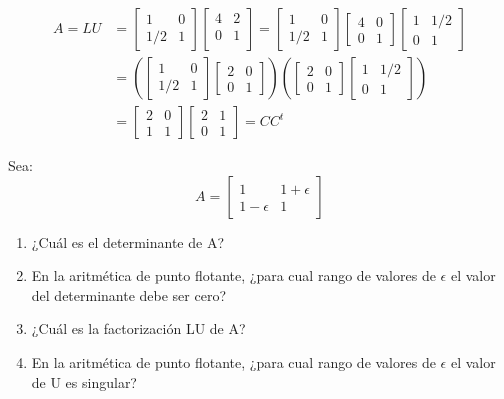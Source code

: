 \documentclass[paper=letter, fontsize=11pt]{scrartcl}
\numberwithin{equation}{section} %
\numberwithin{figure}{section} %
\numberwithin{table}{section} %
\newenvironment{cframed}[1][blue]
  {\begin{tcolorbox}[colframe=#1,colback=white]}
  {\end{tcolorbox}}
\begin{document}
\begin{enumerate}
\[
\begin{split}
A = LU& = \begin{bmatrix}
1 & 0\\
1/2 & 1
\end{bmatrix}  \begin{bmatrix}
4 & 2\\
0 & 1\\
\end{bmatrix} =\begin{bmatrix}
1 & 0\\
1/2 & 1
\end{bmatrix} \begin{bmatrix}
4 & 0\\
0 & 1
\end{bmatrix}  
\begin{bmatrix}
1 & 1/2\\
0 & 1
\end{bmatrix} \\
&=\left(
\begin{bmatrix}
1 & 0\\
1/2 & 1
\end{bmatrix} 
\begin{bmatrix}
2 & 0\\
0 & 1
\end{bmatrix}  \right)
\left(\begin{bmatrix}
2 & 0\\
0 & 1
\end{bmatrix}  
\begin{bmatrix}
1 & 1/2\\
0 & 1
\end{bmatrix}\right)\\
& = 
\begin{bmatrix}
2 & 0\\
1 & 1
\end{bmatrix}
\begin{bmatrix}
2 & 1\\
0 & 1
\end{bmatrix}
=CC^t
\end{split}
\]


\begin{cframed}[teal]
\item Sea: 
\[
A= \begin{bmatrix}
1 & 1+ \epsilon \\
1- \epsilon & 1
\end{bmatrix}
\]
\begin{enumerate}
\item ¿Cuál es el determinante de A? 
\item En la aritmética de punto flotante, ¿para cual rango de valores de $\epsilon$ el valor del determinante debe ser cero? 
\item  ¿Cuál es la factorización LU de A? 
\item En la aritmética de punto flotante, ¿para cual rango de valores de $\epsilon$ el valor de U es singular? 



\end{enumerate}
\end{cframed}
\end{enumerate}
\end{document}
